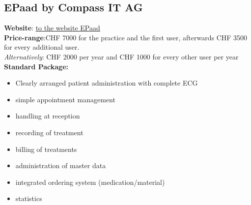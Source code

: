 \documentclass{report}
\begin{document}
\subsection{EPaad by Compass IT AG }
\textbf{Website}: \href{https://epaad.ch/}{to the website EPaad}\\
\textbf{Price-range}:CHF 7000 for the practice and the first user, afterwards CHF 3500 for every additional user. \\
\textit{Alternatively}: CHF 2000 per year and CHF 1000 for every other user per year \\
\textbf{Standard Package:}
\begin{itemize}
   \item Clearly arranged patient administration with complete ECG
   \item simple appointment management
   \item handling at reception
   \item recording of treatment
   \item billing of treatments
   \item administration of master data
   \item integrated ordering system (medication/material)
   \item statistics 
\end{itemize}
\end{document}
